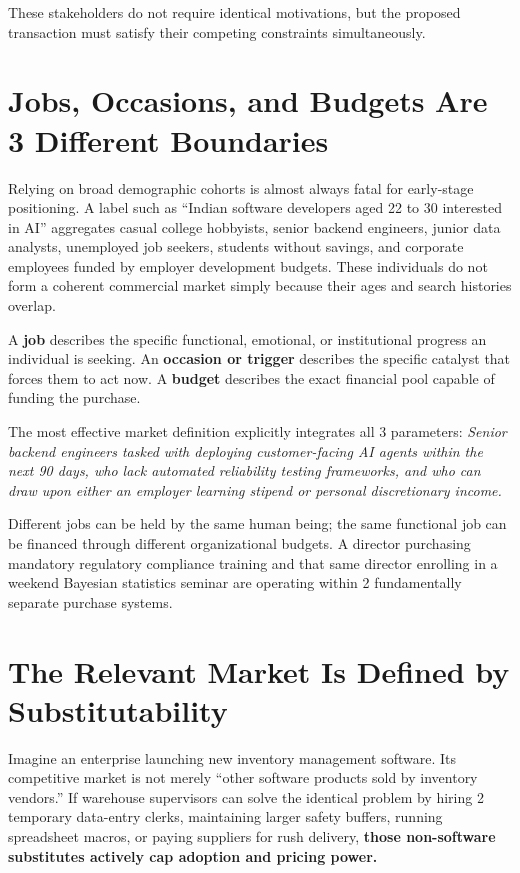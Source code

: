 These stakeholders do not require identical motivations, but the proposed transaction must satisfy their competing constraints simultaneously.

\section{Jobs, Occasions, and Budgets Are 3 Different Boundaries}

Relying on broad demographic cohorts is almost always fatal for early-stage positioning. A label such as ``Indian software developers aged 22 to 30 interested in AI'' aggregates casual college hobbyists, senior backend engineers, junior data analysts, unemployed job seekers, students without savings, and corporate employees funded by employer development budgets. These individuals do not form a coherent commercial market simply because their ages and search histories overlap.

A \textbf{job} describes the specific functional, emotional, or institutional progress an individual is seeking. An \textbf{occasion or trigger} describes the specific catalyst that forces them to act now. A \textbf{budget} describes the exact financial pool capable of funding the purchase.

The most effective market definition explicitly integrates all 3 parameters: \textit{Senior backend engineers tasked with deploying customer-facing AI agents within the next 90 days, who lack automated reliability testing frameworks, and who can draw upon either an employer learning stipend or personal discretionary income.}

Different jobs can be held by the same human being; the same functional job can be financed through different organizational budgets. A director purchasing mandatory regulatory compliance training and that same director enrolling in a weekend Bayesian statistics seminar are operating within 2 fundamentally separate purchase systems.

\section{The Relevant Market Is Defined by Substitutability}

Imagine an enterprise launching new inventory management software. Its competitive market is not merely ``other software products sold by inventory vendors.'' If warehouse supervisors can solve the identical problem by hiring 2 temporary data-entry clerks, maintaining larger safety buffers, running spreadsheet macros, or paying suppliers for rush delivery, \textbf{those non-software substitutes actively cap adoption and pricing power.}

